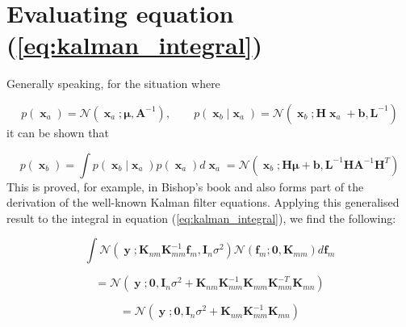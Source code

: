 \documentclass[a4paper, 11pt]{article}
\DeclareMathOperator{\x}{\boldsymbol{x}}
\DeclareMathOperator{\y}{\boldsymbol{y}}
\begin{document}
\newpage
\appendix
\section{Evaluating equation (\ref{eq:kalman_integral})}\label{appendix_integral}
Generally speaking, for the situation where

\begin{equation}
	p(\x_a) = \mathcal{N}(\x_a; \boldsymbol{\mu}, \boldsymbol{A}^{-1}), \qquad p(\x_b | \x_a) = \mathcal{N}(\x_b; \boldsymbol{H}\x_a + \boldsymbol{b}, \boldsymbol{L}^{-1})
\end{equation}
it can be shown that

\begin{equation}
	p(\x_b) = \int p(\x_b | \x_a) p(\x_a) d\x_a = \mathcal{N}(\x_b; \boldsymbol{H}\boldsymbol{\mu} + \boldsymbol{b}, \boldsymbol{L}^{-1}\boldsymbol{HA}^{-1}\boldsymbol{H}^T)
\end{equation}
This is proved, for example, in Bishop's book \cite{bishop2006pattern} and also forms part of the derivation of the well-known Kalman filter equations. Applying this generalised result to the integral in equation (\ref{eq:kalman_integral}), we find the following:

\begin{equation}
	\int \mathcal{N} \left( \y; \boldsymbol{K}_{nm} \boldsymbol{K}_{mm}^{-1} \boldsymbol{f}_m, \boldsymbol{I}_n \sigma^2 \right)
	\mathcal{N}\left( \boldsymbol{f}_m; \boldsymbol{0}, \boldsymbol{K}_{mm} \right) d \boldsymbol{f}_m
\end{equation}

\begin{equation}
	= \mathcal{N} \left( \y; \boldsymbol{0}, \boldsymbol{I}_n \sigma^2 + \boldsymbol{K}_{nm}\boldsymbol{K}_{mm}^{-1}\boldsymbol{K}_{mm} \boldsymbol{K}_{mm}^{-T} \boldsymbol{K}_{mn} \right)
\end{equation}

\begin{equation}
	= \mathcal{N} \left( \y; \boldsymbol{0}, \boldsymbol{I}_n \sigma^2 + \boldsymbol{K}_{nm} \boldsymbol{K}_{mm}^{-1} \boldsymbol{K}_{mn} \right)
\end{equation}











\end{document}
